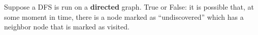 \begin{prob}
    Suppose a DFS is run on a \textbf{directed} graph. True or False: it is possible that,
    at some moment in time, there is a node marked as ``undiscovered'' which has a neighbor
    node that is marked as visited.

    \Tf{}

\end{prob}
